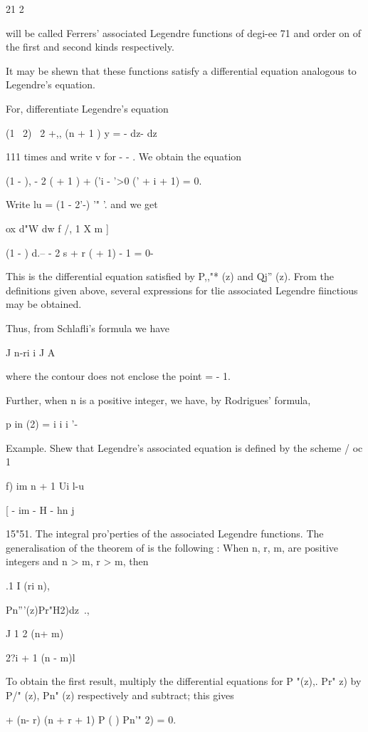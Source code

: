 {{{21 2

%
%

will be called Ferrers' associated Legendre functions of degi-ee 71
and order on of the first and second kinds respectively.

It may be shewn that these functions satisfy a differential equation
analogous to Legendre's equation.

For, differentiate Legendre's equation

(1 \ 2) \ 2 +,, (n + 1 ) y = - dz- dz

111 times and write v for - - . We obtain the equation

(1 - ), - 2 ( + 1 ) + ('i - '>0 (' + i + 1) = 0.

Write lu = (1 - 2'-) '" '. and we get

ox d"W dw f /, 1 X m ]

(1 - ) d.-- - 2 s + r ( + 1) - 1 = 0-

This is the differential equation satisfied by P,,"* (z) and Qj'' (z).
From the definitions given above, several expressions for tlie
associated Legendre fiinctious may be obtained.

Thus, from Schlafli's formula we have

J n-ri i J A

where the contour does not enclose the point = - 1.

Further, when n is a positive integer, we have, by Rodrigues' formula,

p in (2) = i i i '-

Example. Shew that Legendre's associated equation is defined by the
scheme / oc 1

f) im n + 1 Ui l-u 

[ - im - H - hn j

15"51. The integral pro'perties of the associated Legendre functions.
The generalisation of the theorem of is the following : When
n, r, m, are positive integers and n > m, r > m, then

.1 I (ri n),

Pn'''(z)Pr"H2)dz\, .,

J 1 2 (n+ m)\

2?i + 1 (n - m)l

To obtain the first result, multiply the differential equations for P
"(z),. Pr" z) by P/" (z), Pn" (z) respectively and subtract; this
gives

+ (n- r) (n + r + 1) P ( ) Pn'" 2) = 0.

}}}
